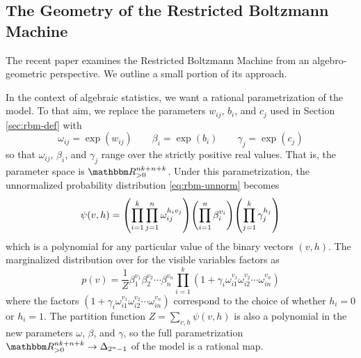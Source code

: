 \documentclass[11pt,titlepage]{article}
\numberwithin{equation}{section}
\begin{document}
    
\subsection{The Geometry of the Restricted Boltzmann Machine}
    The recent paper \cite{CMS09} examines the Restricted Boltzmann Machine from
    an algebro-geometric perspective.  We outline a small portion of its
    approach.
    
    In the context of algebraic statistics, we want a rational parametrization
    of the model.  To that aim, we replace the parameters $w_{ij}$, $b_i$, and
    $c_j$ used in Section \ref{sec:rbm-def} with
    \[
        \omega_{ij} = \exp(w_{ij})
        \qquad
        \beta_i = \exp(b_i)
        \qquad
        \gamma_j = \exp(c_j)
    \]
    so that $\omega_{ij}$, $\beta_i$, and $\gamma_j$ range over the strictly
    positive real values.  That is, the parameter space is $\R_{>0}^{nk+n+k}$.
    Under this parametrization, the unnormalized probability distribution
    \eqref{eq:rbm-unnorm} becomes
    \[
        \psi(v, h) = 
            \pdil*{ \prod_{i=1}^k \prod_{j=1}^n \omega_{ij}^{h_i v_j} }
            \pdil*{ \prod_{i=1}^n \beta_i^{v_i} }
            \pdil*{ \prod_{j=1}^k \gamma_j^{h_j} }
    \]
    which is a polynomial for any particular value of the binary vectors
    $(v,h)$.  The marginalized distribution over for the visible variables
    factors as
    \begin{equation} \label{eq:rbm-alg-par}
        p(v) = \frac 1 Z
        \beta_1^{v_1} \beta_2^{v_2} \cdots \beta_n^{v_n} 
        \prod_{i=1}^k
        (1 + \gamma_i \omega_{i1}^{v_1} \omega_{i2}^{v_2} \cdots \omega_{in}^{v_n})
    \end{equation}
    where the factors $(1 + \gamma_i \omega_{i1}^{v_1} \omega_{i2}^{v_2} \cdots
    \omega_{in}^{v_n})$ correspond to the choice of whether $h_i = 0$ or $h_i =
    1$.  The partition function $Z = \sum_{v,h} \psi(v,h)$ is also a polynomial
    in the new parameters $\omega$, $\beta$, and $\gamma$,  so the full
    parametrization $\R_{>0}^{nk+n+k} \to \Delta_{2^n-1}$ of the model is a
    rational map.  
\end{document}
